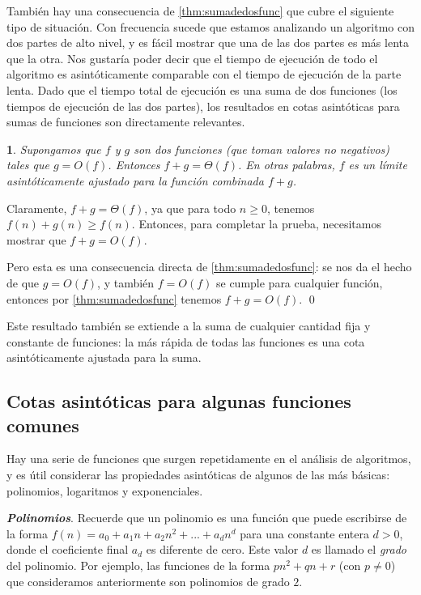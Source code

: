 \documentclass[a4paper, 12pt]{book}
\theoremstyle{dotless}
\newtheorem{theorem}{}%
\renewenvironment{proof}{{\noindent\bfseries Demostración.}}{\qed\vspace{12pt}}
\begin{document}
También hay una consecuencia de \ref{thm:sumadedosfunc} que cubre el siguiente tipo de situación. Con frecuencia sucede que estamos analizando un algoritmo con dos partes de alto nivel, y es fácil mostrar que una de las dos partes es más lenta que la otra. Nos gustaría poder decir que el tiempo de ejecución de todo el algoritmo es asintóticamente comparable con el tiempo de ejecución de la parte lenta. Dado que el tiempo total de ejecución es una suma de dos funciones (los tiempos de ejecución de las dos partes), los resultados en cotas asintóticas para sumas de funciones son directamente relevantes.

\begin{theorem}
Supongamos que $f$ y $g$ son dos funciones (que toman valores no negativos) tales que $g = O(f)$. Entonces $f + g = \Theta(f)$. En otras palabras, $f$ es un límite asintóticamente ajustado para la función combinada $f + g$.
\end{theorem}

\begin{proof}
Claramente, $f + g = \Theta (f)$, ya que para todo $n ≥ 0$, tenemos $f (n) + g (n) ≥ f (n)$. Entonces, para completar la prueba, necesitamos mostrar que $f + g = O(f)$.

Pero esta es una consecuencia directa de \ref{thm:sumadedosfunc}: se nos da el hecho de que $g = O(f)$, y también $f = O (f)$ se cumple para cualquier función, entonces por \ref{thm:sumadedosfunc} tenemos $f + g = O(f)$. 
\end{proof}

Este resultado también se extiende a la suma de cualquier cantidad fija y constante de funciones: la más rápida de todas las funciones es una cota asintóticamente ajustada para la suma.

\subsection*{Cotas asintóticas para algunas funciones comunes}

Hay una serie de funciones que surgen repetidamente en el análisis de algoritmos, y es útil considerar las propiedades asintóticas de algunos de las más básicas: polinomios, logaritmos y exponenciales.

\textit{\textbf{Polinomios}}. Recuerde que un polinomio es una función que puede escribirse de la forma $f(n) = a_0 + a_1n + a_2n^2 + ... + a_dn^d$ para una constante entera $d>0$, donde el coeficiente final $a_d$ es diferente de cero. Este valor $d$ es llamado el \textit{grado} del polinomio. Por ejemplo, las funciones de la forma $pn^2 + qn + r$ (con $p \neq 0$) que consideramos anteriormente son polinomios de grado $2$.
\end{document}
